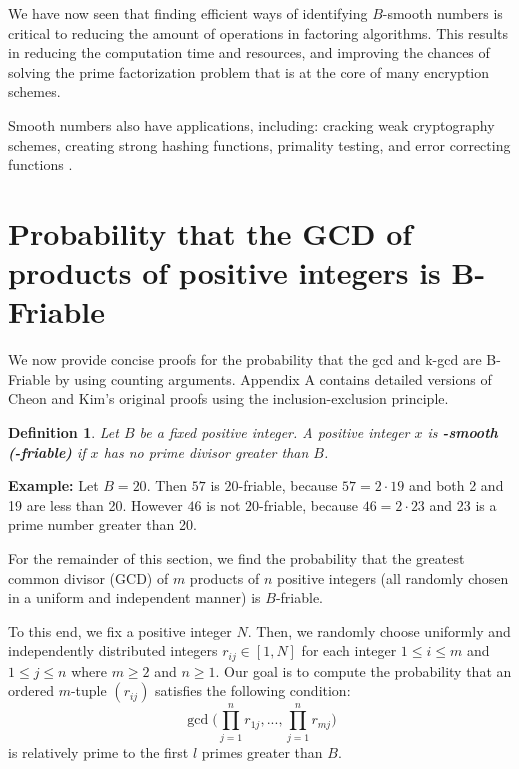 \documentclass[12pt]{amsart}
\newtheorem{definition}[theorem]{Definition}
\theoremstyle{definition}
\begin{document}
We have now seen that finding efficient ways of identifying $B$-smooth numbers is critical to reducing the amount of operations in factoring algorithms. This results in reducing the computation time and resources, and improving the chances of solving the prime factorization problem that is at the core of many encryption schemes. 

Smooth numbers also have applications, including: cracking weak cryptography schemes, creating strong hashing functions, primality testing, and error correcting functions \cite{Naccache}.

\section{Probability that the GCD of products of positive integers is  B-Friable}
We now provide concise proofs for the probability that the gcd and k-gcd are B-Friable by using counting arguments. Appendix A contains detailed versions of Cheon and Kim's original proofs using the inclusion-exclusion principle. %

\begin{definition} Let $B$ be a fixed positive integer. A positive integer $x$ is \textbf{-smooth (-friable)} if $x$ has no prime divisor greater than $B$. 
\end{definition}

\noindent \textbf{Example:} Let $B = 20$. Then $57$ is $20$-friable, because $57 = 2 \cdot 19$ and both 2 and 19 are less than 20. However $46$ is not $20$-friable, because $46= 2 \cdot 23$ and 23 is a prime number greater than 20.

\vspace{.1 in}

For the remainder of this section, we find the probability that the greatest common divisor (GCD) of $m$ products of $n$ positive integers (all randomly chosen in a uniform and independent manner) is $B$-friable.

\vspace{.1 in}

To this end, we fix a positive integer $N$. Then, we randomly choose uniformly and independently distributed  integers $r_{ij} \in [1, N]$ for each integer $1 \leq i \leq m$ and $1 \leq j \leq n$ where $m \geq 2$ and $n \geq 1$. Our goal is to compute the probability that an ordered $m$-tuple $(r_{ij})$ satisfies the following condition:
$$\gcd\Big(\prod_{j=1}^nr_{1j}, ..., \prod_{j=1}^n r_{mj}\Big)$$
is relatively prime to the first $l$ primes greater than $B$. 
\end{document}
